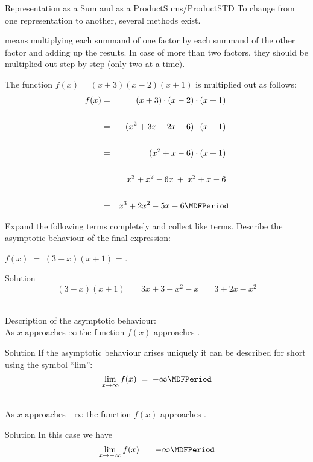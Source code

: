 \begin{MXContent}{Representation as a Sum and as a Product}{Sums/Product}{STD}
To change from one representation to another, several methods exist.

\begin{MInfo}
 means multiplying each summand of one factor by each summand of the other factor and 
adding up the results. In case of more than two factors, they should be multiplied out step by step (only two at a time).
\end{MInfo}

\begin{MExample}
The function $f(x)=(x+3)(x-2)(x+1)$ is multiplied out as follows:
\begin{eqnarray*}
f(x)
& = & (x+3)\cdot (x-2)\cdot (x+1) \ \\ \ \\
& = & (x^2+3x-2x-6)\cdot (x+1) \ \\ \ \\
& = & (x^2+x-6)\cdot (x+1) \ \\ \ \\
& = & x^3+x^2-6x\: +\: x^2+x-6 \ \\ \ \\
& = & x^3+2x^2-5x-6 \MDFPeriod
\end{eqnarray*}
\end{MExample}

\begin{MExercise}
Expand the following terms completely and collect like terms. Describe the asymptotic behaviour of the final expression: 
\begin{MExerciseItems}
\item{$f(x)\;=\;(3-x)(x+1)$ = .
\begin{MHint}{Solution}$$(3-x)(x+1) \; = \; 3x + 3 -x^2 -x \;=\; 3 + 2x - x^2 $$\end{MHint}\\

Description of the asymptotic behaviour:\\ 
As $x$ approaches $\infty$ the function $f(x)$ approaches
\;. \begin{MHint}{Solution}%
If the asymptotic behaviour arises uniquely it can be described for short using the symbol ``lim'':
$$\lim_{x\rightarrow \infty} f(x) \; = \; -\infty \MDFPeriod$$\end{MHint}\\  %
As $x$ approaches $-\infty$ the function $f(x)$ approaches
\;. \\
\begin{MHint}{Solution}%
In this case we have 
$$\lim_{x\rightarrow -\infty} f(x) \; = \; -\infty \MDFPeriod$$\end{MHint}

}
\end{MExerciseItems}
\end{MExercise}
\end{MXContent}
